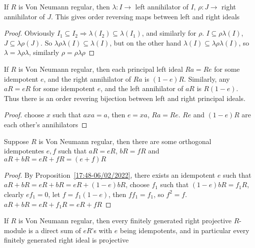 \documentclass[main]{subfiles}
\begin{document}
\begin{proposition}
If $R$ is Von Neumann regular, then $\lambda:I\to$ left annihilator of $I$,  $\rho:J\to$ right annihilator of $J$. This gives order reversing maps between left and right ideals
\end{proposition}

\begin{proof}
Obviously $I_1\subseteq I_2\Rightarrow\lambda(I_2)\subseteq\lambda(I_1)$, and similarly for $\rho$. $I\subseteq\rho\lambda(I)$, $J\subseteq\lambda\rho(J)$. So $\lambda\rho\lambda(I)\subseteq\lambda(I)$, but on the other hand $\lambda(I)\subseteq\lambda\rho\lambda(I)$, so $\lambda=\lambda\rho\lambda$, similarly $\rho=\rho\lambda\rho$
\end{proof}

\begin{proposition}\label{17:48-06/02/2022}
If $R$ is Von Neumann regular, then each principal left ideal $Ra=Re$ for some idempotent $e$, and the right annihilator of $Ra$ is $(1-e)R$. Similarly, any $aR=eR$ for some idempotent $e$, and the left annihilator of $aR$ is $R(1-e)$. Thus there is an order revering bijection between left and right principal ideals.
\end{proposition}

\begin{proof}
choose $x$ such that $axa=a$, then $e=xa$, $Ra=Re$. $Re$ and $(1-e)R$ are each other's annihilators
\end{proof}

\begin{proposition}
Suppose $R$ is Von Neumann regular, then there are some orthogonal idempotentes $e,f$ such that $aR=eR$, $bR=fR$ and $aR+bR=eR+fR=(e+f)R$
\end{proposition}

\begin{proof}
By Proposition~\ref{17:48-06/02/2022}, there exists an idempotent $e$ such that $aR+bR=eR+bR=eR+(1-e)bR$, choose $f_1$ such that $(1-e)bR=f_1R$, clearly $ef_1=0$, let $f=f_1(1-e)$, then $ff_1=f_1$, so $f^2=f$. $aR+bR=eR+f_1R=eR+fR$
\end{proof}

\begin{corollary}
If $R$ is Von Neumann regular, then every finitely generated right projective $R$-module is a direct sum of $eR$'s with $e$ being idempotents, and in particular every finitely generated right ideal is projective
\end{corollary}
\end{document}
